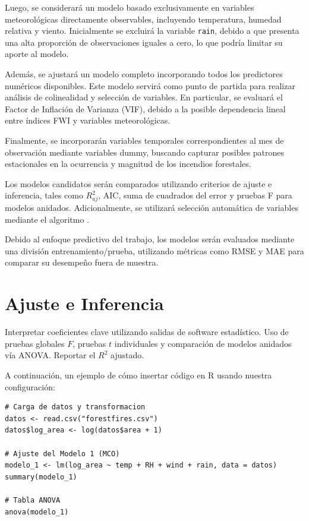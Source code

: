 Luego, se considerará un modelo basado exclusivamente en variables meteorológicas directamente observables, incluyendo temperatura, humedad relativa y viento. Inicialmente se excluirá la variable \texttt{rain}, debido a que presenta una alta proporción de observaciones iguales a cero, lo que podría limitar su aporte al modelo.

Además, se ajustará un modelo completo incorporando todos los predictores numéricos disponibles. Este modelo servirá como punto de partida para realizar análisis de colinealidad y selección de variables. En particular, se evaluará el Factor de Inflación de Varianza (VIF), debido a la posible dependencia lineal entre índices FWI y variables meteorológicas.

Finalmente, se incorporarán variables temporales correspondientes al mes de observación mediante variables dummy, buscando capturar posibles patrones estacionales en la ocurrencia y magnitud de los incendios forestales.

Los modelos candidatos serán comparados utilizando criterios de ajuste e inferencia, tales como $R^2_{aj}$, AIC, suma de cuadrados del error y pruebas F para modelos anidados. Adicionalmente, se utilizará selección automática de variables mediante el algoritmo .

Debido al enfoque predictivo del trabajo, los modelos serán evaluados mediante una división entrenamiento/prueba, utilizando métricas como RMSE y MAE para comparar su desempeño fuera de muestra.

\section{Ajuste e Inferencia}
Interpretar coeficientes clave utilizando salidas de software estadístico. 
Uso de pruebas globales $F$, pruebas $t$ individuales y comparación de modelos anidados vía ANOVA. Reportar el $R^2$ ajustado.

A continuación, un ejemplo de cómo insertar código en R usando nuestra configuración:

\begin{lstlisting}[caption={Ajuste del modelo inicial en R}, label={lst:modelo1}]
# Carga de datos y transformacion
datos <- read.csv("forestfires.csv")
datos$log_area <- log(datos$area + 1)

# Ajuste del Modelo 1 (MCO)
modelo_1 <- lm(log_area ~ temp + RH + wind + rain, data = datos)
summary(modelo_1)

# Tabla ANOVA
anova(modelo_1)
\end{lstlisting}

